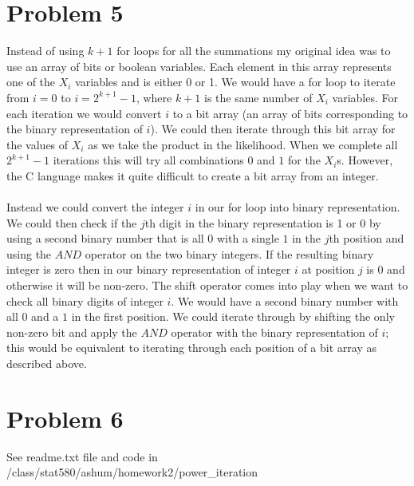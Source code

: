 \documentclass{article}\usepackage[]{graphicx}\usepackage[]{color}
\begin{document}
\section{Problem 5}
Instead of using $k+1$ for loops for all the summations my original idea was to use an array of bits or boolean variables.  Each element in this array represents one of the $X_i$ variables and is either 0 or 1.  We would have a for loop to iterate from $i=0$ to $i=2^{k + 1} - 1$, where $k + 1$ is the same number of $X_i$ variables.  For each iteration we would convert $i$ to a bit array (an array of bits corresponding to the binary representation of $i$).  We could then iterate through this bit array for the values of $X_i$ as we take the product in the likelihood.  When we complete all $2^{k + 1} - 1$ iterations this will try all combinations $0$ and $1$ for the $X_i$s.  However, the C language makes it quite difficult to create a bit array from an integer.\\
\\
Instead we could convert the integer $i$ in our for loop into binary representation.  We could then check if the $j$th digit in the binary representation is 1 or 0 by using a second binary number that is all $0$ with a single $1$ in the $j$th position and using the $AND$ operator on the two binary integers.  If the resulting binary integer is zero then in our binary representation of integer $i$ at position $j$ is 0 and otherwise it will be non-zero.  The shift operator comes into play when we want to check all binary digits of integer $i$.  We would have a second binary number with all $0$ and a $1$ in the first position.  We could iterate through by shifting the only non-zero bit and apply the $AND$ operator with the binary representation of $i$; this would be equivalent to iterating through each position of a bit array as described above.

\section{Problem 6}
See readme.txt file and code in /class/stat580/ashum/homework2/power\_iteration
\end{document}
